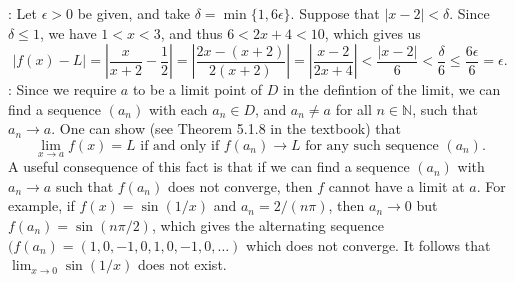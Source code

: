 \documentclass[letterpaper,12pt]{article}
\newcommand{\N}{\mathbb{N}}
\newcommand{\abs}[1]{\lvert #1\rvert}
\newcommand{\Abs}[1]{\left| #1 \right|}
\begin{document}
: Let $\epsilon>0$ be given, and take $\delta = \min\{1,6\epsilon\}$. Suppose that $\abs{x-2}<\delta$. Since $\delta\leq 1$, we have $1<x<3$, and thus $6<2x+4<10$, which gives us
\[
 \abs{f(x)-L}  = \Abs{\frac{x}{x+2}-\frac{1}{2}} = \Abs{\frac{2x-(x+2)}{2(x+2)}} = \Abs{\frac{x-2}{2x+4}} < \frac{\abs{x-2}}{6} <\frac{\delta}{6}\leq\frac{6\epsilon}{6}=\epsilon.
\]
: Since we require $a$ to be a limit point of $D$ in the defintion of the limit, we can find a sequence $(a_n)$ with each $a_n\in D$, and $a_n\neq a$ for all $n\in \N$, such that $a_n\to a$. One can show (see Theorem 5.1.8 in the textbook) that
\[
 \lim_{x\to a}f(x) = L \text{ if and only if } f(a_n) \to L \text{ for any such sequence } (a_n).
\]
A useful consequence of this fact is that if we can find a sequence $(a_n)$ with $a_n\to a$ such that $f(a_n)$ does not converge, then $f$ cannot have a limit at $a$. For example, if $f(x)=\sin(1/x)$ and $a_n = 2/(n\pi)$, then $a_n\to 0$ but $f(a_n) = \sin(n\pi/2)$, which gives the alternating sequence $(f(a_n) = (1, 0, -1 , 0, 1, 0, -1, 0,\ldots)$ which does not converge. It follows that $\lim_{x\to 0}\sin(1/x)$ does not exist.
\end{document}
